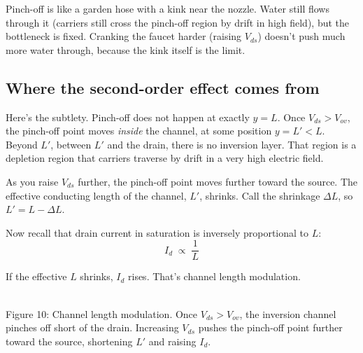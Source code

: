 \documentclass[11pt]{article}
\begin{document}
\begin{hook}
Pinch-off is like a garden hose with a kink near the nozzle. Water still flows through it (carriers still cross the pinch-off region by drift in high field), but the bottleneck is fixed. Cranking the faucet harder (raising $V_{ds}$) doesn't push much more water through, because the kink itself is the limit.
\end{hook}

\subsection{Where the second-order effect comes from}

Here's the subtlety. Pinch-off does not happen at exactly $y = L$. Once $V_{ds} > V_{ov}$, the pinch-off point moves \emph{inside} the channel, at some position $y = L' < L$. Beyond $L'$, between $L'$ and the drain, there is no inversion layer. That region is a depletion region that carriers traverse by drift in a very high electric field.

As you raise $V_{ds}$ further, the pinch-off point moves further toward the source. The effective conducting length of the channel, $L'$, shrinks. Call the shrinkage $\Delta L$, so $L' = L - \Delta L$.

Now recall that drain current in saturation is inversely proportional to $L$:
\[
I_d \;\propto\; \frac{1}{L}
\]

If the effective $L$ shrinks, $I_d$ rises. That's channel length modulation.

\begin{center}
\\
{\small Figure 10: Channel length modulation. Once $V_{ds} > V_{ov}$, the inversion channel pinches off short of the drain. Increasing $V_{ds}$ pushes the pinch-off point further toward the source, shortening $L'$ and raising $I_d$.}
\end{center}
\end{document}

